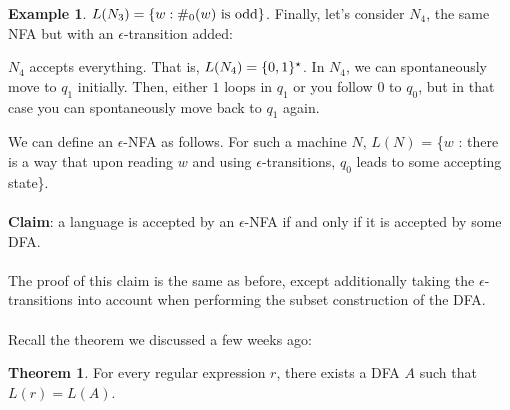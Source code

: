 \documentclass[]{article}
\DeclarePairedDelimiter{\set}{\lbrace}{\rbrace}
\theoremstyle{definition}
\newtheorem*{theorem}{Theorem}
\newtheorem{ex}{Example}[section]
\begin{document}
\begin{ex}
          $L(N_3) = \set{ w : \#_0(w) \text{ is odd}}$. Finally, let's consider $N_4$, the same NFA but with an $\epsilon$-transition added:
          \begin{center}
          \end{center}

          $N_4$ accepts everything. That is, $L(N_4) = \set{0, 1}^\star$. In $N_4$, we can spontaneously move to $q_1$ initially. Then, either $1$ loops in $q_1$ or you follow $0$ to $q_0$, but in that case you can spontaneously move back to $q_1$ again.
        \end{ex}

        We can define an $\epsilon$-NFA as follows. For such a machine $N$, $L(N)$ = \{$w$ : there is a way that upon reading $w$ and using $\epsilon$-transitions, $q_0$ leads to some accepting state\}.
        \\ \\
        \textbf{Claim}: a language is accepted by an $\epsilon$-NFA if and only if it is accepted by some DFA.
        \\ \\
        The proof of this claim is the same as before, except additionally taking the $\epsilon$-transitions into account when performing the subset construction of the DFA.
        \\ \\
        Recall the theorem we discussed a few weeks ago:
        \begin{theorem}
          For every regular expression $r$, there exists a DFA $A$ such that $L(r) = L(A)$.
        \end{theorem}
\end{document}
